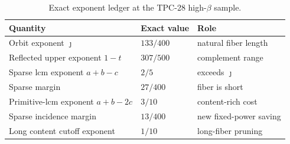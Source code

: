 \begin{table}[t]
\centering
\caption{Exact exponent ledger at the TPC-28 high-$\beta$ sample.}
\label{tab:tpc29-high-ledger}
\begin{tabular}{@{}lll@{}}
\toprule
Quantity & Exact value & Role \\
\midrule
Orbit exponent $\jmath$ & $133/400$ & natural fiber length \\
Reflected upper exponent $1-t$ & $307/500$ & complement range \\
Sparse lcm exponent $a+b-c$ & $2/5$ & exceeds $\jmath$ \\
Sparse margin & $27/400$ & fiber is short \\
Primitive-lcm exponent $a+b-2c$ & $3/10$ & content-rich cost \\
Sparse incidence margin & $13/400$ & new fixed-power saving \\
Long content cutoff exponent & $1/10$ & long-fiber pruning \\
\bottomrule
\end{tabular}
\end{table}
